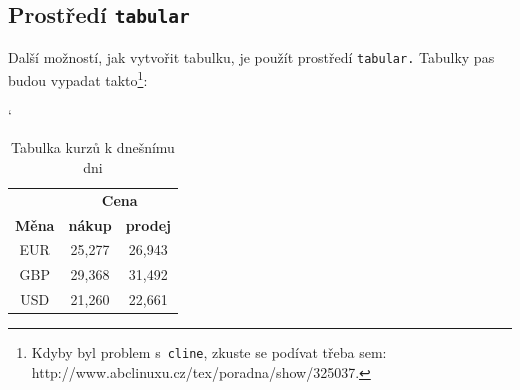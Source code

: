 \documentclass[a4paper, 11pt]{article}
\begin{document}
\subsection{Prostředí \texttt{tabular}}
Další možností, jak vytvořit tabulku, je použít prostředí \texttt{tabular.} Tabulky pas budou vypadat takto\footnote{Kdyby byl problem s~\texttt{cline}, zkuste se podívat třeba sem:  http://www.abclinuxu.cz/tex/poradna/show/325037.}:

\bigskip
\catcode`
\begin{table}[h]
    \centering
\begin{tabular}{ | c | c | c |}
    \hline
                  & \multicolumn{2}{|c|}{\textbf{Cena}} \\ \cline{2-3}
    \textbf{Měna} & \textbf{nákup}   &   \textbf{prodej}\\ \hline
    EUR          & 25,277           & 26,943           \\
    GBP          & 29,368           & 31,492           \\
    USD          & 21,260           & 22,661           \\ \hline
    
\end{tabular}
\caption{Tabulka kurzů k dnešnímu dni}
\label{tables:table1}
\end{table}
\end{document}
